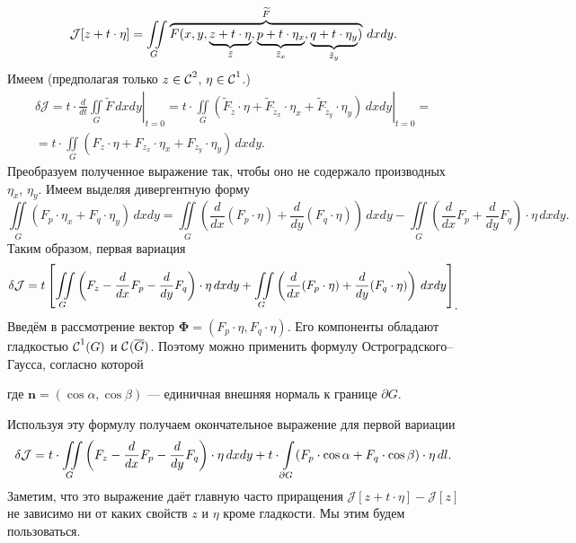 \documentclass[12pt,a4paper,openany,fleqn]{book}
\newcommand{\R}{\ensuremath{\mathbb{R}}}
\newcommand{\Cf}{\ensuremath{\mathcal{C}}}
\newcommand{\J}{\ensuremath{\mathcal{J}}}
\newcommand{\Cfn}[2][]{\ensuremath{\Cf{\mathstrut}^{#2}_{#1}}}
\newcommand{\der}[2]{\ensuremath{\frac{d#1}{d#2}}}
\DeclareMathOperator{\Div}{div}
\theoremstyle{definition}
\begin{document}
	\begin{equation*}
		\hfill\J[z+t\cdot\eta]=\iint\limits_{G}\overbrace{F(x,y,\underbrace{z+t\cdot\eta}_{\tilde{z}},\underbrace{p+t\cdot\eta_x}_{\tilde{z}_x},\underbrace{q+t\cdot\eta_y}_{\tilde{z}_y})}^{\widetilde{F}}\,dxdy.\hfill
	\end{equation*}
	Имеем (предполагая только $z\in\Cfn{2}$, $\eta\in\Cfn{1}$.)
	\begin{multline*}
		\delta\J=\left.t\cdot\der{}{t}\iint\limits_{G}\widetilde{F}\,dxdy\right|_{t=0}=\left.t\cdot\iint\limits_{G}\left(\widetilde{F}_{\tilde{z}}\cdot\eta+\widetilde{F}_{\tilde{z}_x}\cdot\eta_x+\widetilde{F}_{\tilde{z}_y}\cdot\eta_y\right)\,dxdy\right|_{t=0}=\\=t\cdot\iint\limits_{G}\left({F}_{z}\cdot\eta+{F}_{z_x}\cdot\eta_x+{F}_{z_y}\cdot\eta_y\right)\,dxdy.
	\end{multline*}
	Преобразуем полученное выражение так, чтобы оно не содержало производных $\eta_x$, $\eta_y$. Имеем выделяя дивергентную форму 
	\begin{equation*}
		\iint\limits_{G}\left(F_p\cdot\eta_x+F_q\cdot\eta_y\right)\,dxdy=\iint\limits_{G}\left(\der{}{x}(F_p\cdot\eta)+\der{}{y}(F_q\cdot\eta)\right)\,dxdy-\iint\limits_{G}\left(\der{}{x}F_p+\der{}{y}F_q\right)\cdot\eta\,dxdy.
	\end{equation*}
	Таким образом, первая вариация
	\begin{equation*}
		\hfill\delta\J=t\left[\iint\limits_{G}\left(F_z-\der{}{x}F_p-\der{}{y}F_q\right)\cdot\eta\,dxdy+\iint\limits_{G}\left(\der{}{x}(F_p\cdot\eta)+\der{}{y}(F_q\cdot\eta)\right)\,dxdy\right]_{\displaystyle.}\hfill
	\end{equation*}
	Введём в рассмотрение вектор $\bm{\Phi}=(F_p\cdot\eta,F_q\cdot\eta)$. Его компоненты обладают гладкостью $\Cfn{1}(G)$ и $\Cfn{}(\overline{G})$. Поэтому можно применить формулу Остроградского--Гаусса, согласно которой
	\begin{center}
		\fbox{\parbox{0.32\textwidth}{$\displaystyle\iint\limits_{G}\Div\bm{\Phi}\,dxdy=\int\limits_{\partial G}\big(\bm{\Phi},\bm{n}\big)_{\R^2}\,dl,$}}
	\end{center}
	где $\bm{n}=(\cos\alpha,\cos\beta)$ --- единичная внешняя нормаль к границе $\partial G$.
	
	\noindent Используя эту формулу получаем окончательное выражение для первой вариации
	\begin{equation}\label{l9:eq:10}
		\hfill\delta\J=t\cdot\iint\limits_{G}\left(F_z-\der{}{x}F_p-\der{}{y}F_q\right)\cdot\eta\,dxdy+t\cdot\int\limits_{\partial G}(F_p\cdot\cos\alpha+F_q\cdot\cos\beta)\cdot\eta\,dl.\hfill
	\end{equation}
	Заметим, что это выражение даёт главную часто приращения $\J[z+t\cdot\eta]-\J[z]$ не зависимо ни от каких свойств $z$ и $\eta$ кроме гладкости. Мы этим будем пользоваться.
	
\end{document}
